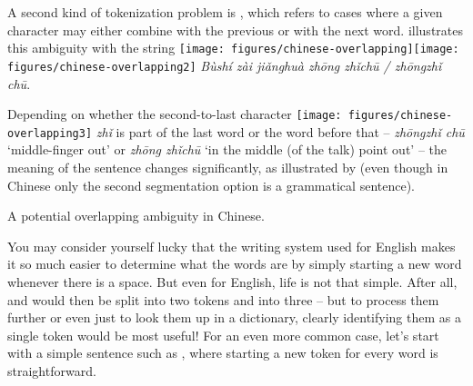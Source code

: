 A second kind of tokenization problem is , which refers to cases where a given character
may either combine with the previous or with the next word.
\citet[72]{Lu-07} illustrates this ambiguity
with the string \texttt{[image: figures/chinese-overlapping]}\texttt{[image: figures/chinese-overlapping2]} \textit{B\`ush\'i z\`ai ji\v{a}nghu\`a zh\={o}ng zh\v{i}ch\={u} / zh\={o}ngzh\v{i} ch\={u}}.  

Depending on whether the second-to-last
character \texttt{[image: figures/chinese-overlapping3]} \textit{zh\v{i}} is part of the last word or the
word before that -- \textit{zh\={o}ngzh\v{i} ch\={u}} `middle-finger out' or \textit{zh\={o}ng zh\v{i}ch\={u}} `in the middle (of the talk) point out' -- the meaning of the sentence changes significantly,
as illustrated by  (even though
in Chinese only the second segmentation option is a grammatical
sentence).


\ea A potential overlapping ambiguity in Chinese.\\
  \label{exfig:chinese-tokenization}
\let\eachwordone=\cn

	\z
\z

\let\eachwordone=\upshape



You may consider yourself lucky that the writing system used for
English makes it so much easier to determine what the words are by
simply starting a new word whenever there is a space. But even for
English, life is not that simple. After all,  and
 would then be split into two tokens and  into three -- but to process them further or even just to
look them up in a dictionary, clearly identifying them as a single
token would be most useful! For an even more common case, let's start
with a simple sentence such as , where starting a new
token for every word is straightforward.

